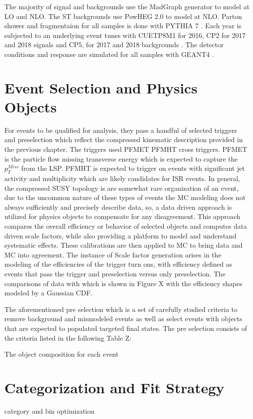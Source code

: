 
The majority of signal and backgrounds use the MadGraph \cite{madgraph} generator to model at LO and NLO. The ST backgrounds use PowHEG 2.0 \cite{powheg} to model at NLO. Parton shower and fragmentaion for all samples is done with PYTHIA 7 \cite{pythia}. Each year is subjected to an underlying event tunes with CUETP8M1 for 2016, CP2 for 2017 and 2018 signals and CP5, for 2017 and 2018 backgrounds \cite{erich tunes}. The detector conditions and response are simulated for all samples with GEANT4 \cite{geant}.
 
\section{Event Selection and Physics Objects}
 For events to be qualified for analysis, they pass a handful of selected triggers and preselection which reflect the compressed kinematic description provided in the previous chapter. The triggers used PFMET PFMHT cross triggers. PFMET is the particle flow missing transverse energy which is expected to capture the $p_T^{Miss}$ from the LSP. PFMHT is expected to trigger on events with significant jet activity and multiplicity which are likely candidates for ISR events.  In general, the compressed SUSY topology is are somewhat rare organization of an event, due to the uncommon nature of these types of events the MC modeling does not always sufficiently and precisely describe data, so,  a data driven approach is utilized for physics objects to compensate for any disagreement. This approach compares the overall efficiency or behavior of selected objects and computes data driven scale factors, while also providing a platform to model and understand systematic effects. These calibrations are then applied to MC to bring data and MC into agreement. The instance of Scale factor generation arises in the modeling of the efficiencies of the trigger turn ons, with efficiency defined as events that pass the trigger and preselection versus only preselection. The comparisons of data with  which is shown in Figure X with the efficiency shapes modeled by a Gaussian CDF.  


The aforementioned pre selection which is a set of carefully studied criteria to remove background and mismodeled events as well as select events with objects that are expected to populated targeted final states. The pre selection consists of the criteria listed in the following Table Z:


The object composition for each event 



\section{Categorization and Fit Strategy}

category and bin optimization
